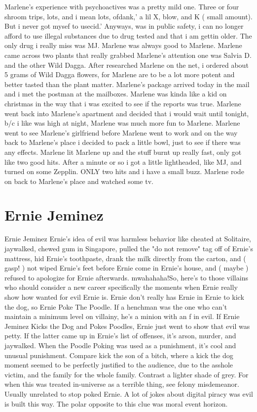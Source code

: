 \documentclass[12pt]{book}
\begin{document}
Marlene's experience with psychoactives was a pretty mild one. Three or four shroom trips, lots, and i mean lots, ofdank,' a lil X, blow, and K ( small amount). But i never got mysef to usecid.' Anyways, was in public safety, i can no longer afford to use illegal substances due to drug tested and that i am gettin older. The only drug i really miss was MJ. Marlene was always good to Marlene. Marlene came across two plants that really grabbed Marlene's attention one was Salvia D. and the other Wild Dagga. After researched Marlene on the net, i ordered about 5 grams of Wild Dagga flowers, for Marlene are to be a lot more potent and better tasted than the plant matter. Marlene's package arrived today in the mail and i met the postman at the mailboxes. Marlene was kinda like a kid on christmas in the way that i was excited to see if the reports was true. Marlene went back into Marlene's apartment and decided that i would wait until tonight, b/c i like was high at night, Marlene was much more fun to Marlene. Marlene went to see Marlene's girlfriend before Marlene went to work and on the way back to Marlene's place i decided to pack a little bowl, just to see if there was any effects. Marlene lit Marlene up and the stuff burnt up really fast, only got like two good hits. After a minute or so i got a little lightheaded, like MJ, and turned on some Zepplin. ONLY two hits and i have a small buzz. Marlene rode on back to Marlene's place and watched some tv.



\chapter{Ernie Jeminez}

Ernie Jeminez  Ernie's idea of evil was harmless behavior like cheated at Solitaire, jaywalked, chewed gum in Singapore, pulled the "do not remove" tag off of Ernie's mattress, hid Ernie's toothpaste, drank the milk directly from the carton, and ( gasp! ) not wiped Ernie's feet before Ernie come in Ernie's house, and ( maybe ) refused to apologize for Ernie afterwards. mwahahaha!So, here's to those villains who should consider a new career  specifically the moments when Ernie really show how wanted for evil Ernie is. Ernie don't really has Ernie in Ernie to kick the dog, so Ernie Poke The Poodle. If a henchman was the one who can't maintain a minimum level on villainy, he's a minion with an f in evil. If Ernie Jeminez Kicks the Dog and Pokes Poodles, Ernie just went to show that evil was petty. If the latter came up in Ernie's list of offenses, it's arson, murder, and jaywalked. When the Poodle Poking was used as a punishment, it's cool and unusual punishment. Compare kick the son of a bitch, where a kick the dog moment seemed to be perfectly justified to the audience, due to the asshole victim, and the family for the whole family. Contrast a lighter shade of grey. For when this was treated in-universe as a terrible thing, see felony misdemeanor. Usually unrelated to stop poked Ernie. A lot of jokes about digital piracy was evil is built this way. The polar opposite to this clue was moral event horizon.
\end{document}
